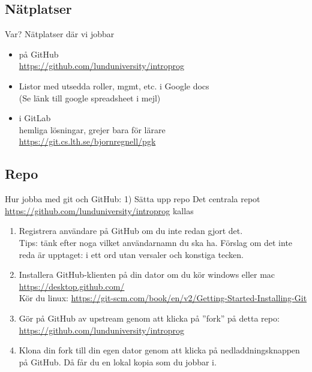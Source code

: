 \documentclass{slides}
\begin{document}
\subsection{Nätplatser}
\begin{Slide}{Var? Nätplatser där vi jobbar}
\begin{itemize}
\item {} på GitHub \\ \url{https://github.com/lunduniversity/introprog}
\item Listor med utsedda roller, mgmt, etc. i Google docs \\  
(Se länk till google spreadsheet i mejl)
\item {} i GitLab\\ hemliga lösningar, grejer bara för lärare \\ \url{https://git.cs.lth.se/bjornregnell/pgk}
\end{itemize}
\end{Slide}

\subsection{Repo}
\begin{Slide}{Hur jobba med git och GitHub: 1) Sätta upp repo}\footnotesize
Det centrala repot \url{https://github.com/lunduniversity/introprog} kallas 
\begin{enumerate}
\item Registrera användare på GitHub om du inte redan gjort det. \\Tips: tänk efter noga vilket användarnamn du ska ha. Förslag om det inte reda är upptaget:  i ett ord utan versaler och konstiga tecken.
\item Installera GitHub-klienten på din dator om du kör windows eller mac \\ \url{https://desktop.github.com/} \\
Kör du linux:  \url{https://git-scm.com/book/en/v2/Getting-Started-Installing-Git}
\item Gör  på GitHub av upstream genom att klicka på ''fork'' på detta repo: \url{https://github.com/lunduniversity/introprog}
\item Klona din fork till din egen dator genom att klicka på nedladdningsknappen på GitHub. Då får du en lokal kopia som du jobbar i.
\end{enumerate}
\end{Slide}
\end{document}
